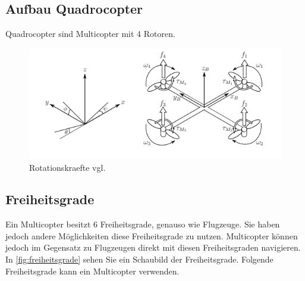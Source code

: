 
\subsection{Aufbau Quadrocopter}

Quadrocopter sind Multicopter mit 4 Rotoren. 


\begin{figure}
    \begin{centering}
        \includegraphics[scale=0.6]{images/inertial_body_frames.png}
        \caption{\label{fig:frames}Rotationskraefte vgl. \cite{luukkonen2011modelling}}
    \end{centering}
\end{figure}


\subsection{Freiheitsgrade}

Ein Multicopter besitzt 6 Freiheitsgrade, genauso wie Flugzeuge. Sie haben jedoch andere Möglichkeiten diese Freiheitsgrade zu nutzen.
Multicopter können jedoch im Gegensatz zu Flugzeugen direkt mit diesen Freiheitsgraden navigieren. In \ref{fig:freiheitsgrade} sehen Sie ein Schaubild der Freiheitsgrade.
Folgende Freiheitsgrade kann ein Multicopter verwenden.

